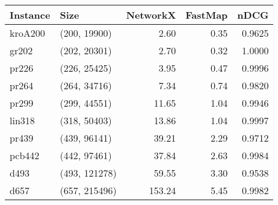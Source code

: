 \begin{tabular}{llrrr}
\toprule
Instance &          Size &  NetworkX &  FastMap &   nDCG \\
\midrule
 kroA200 &  (200, 19900) &      2.60 &     0.35 & 0.9625 \\
   gr202 &  (202, 20301) &      2.70 &     0.32 & 1.0000 \\
   pr226 &  (226, 25425) &      3.95 &     0.47 & 0.9996 \\
   pr264 &  (264, 34716) &      7.34 &     0.74 & 0.9820 \\
   pr299 &  (299, 44551) &     11.65 &     1.04 & 0.9946 \\
  lin318 &  (318, 50403) &     13.86 &     1.04 & 0.9997 \\
   pr439 &  (439, 96141) &     39.21 &     2.29 & 0.9712 \\
  pcb442 &  (442, 97461) &     37.84 &     2.63 & 0.9984 \\
    d493 & (493, 121278) &     59.55 &     3.30 & 0.9538 \\
    d657 & (657, 215496) &    153.24 &     5.45 & 0.9982 \\
\bottomrule
\end{tabular}

